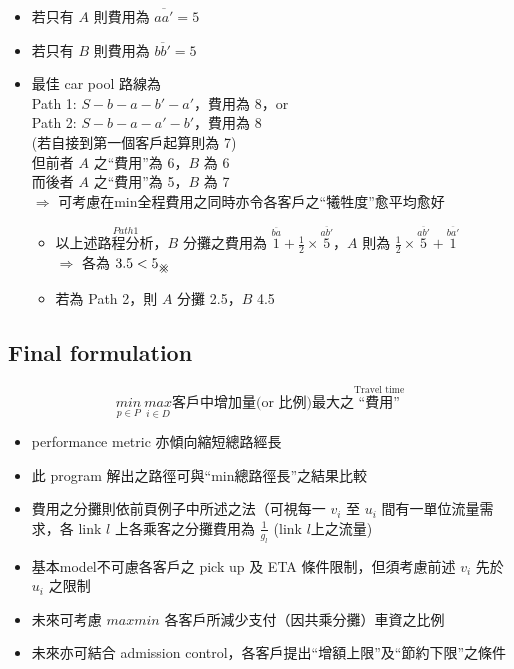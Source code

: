 \documentclass{article}
\newcommand\hash{\mathbin{\mathpalette\xhash\relax}}
\newcommand{\xhash}[2]{\ooalign{%
  $#1\xxhash{#1}{-45}$\cr
  $#1\xxhash{#1}{45}$\cr
  }%
}
\newcommand{\xxhash}[2]{\rotatebox[origin=c]{#2}{$#1\parallel$}}
\begin{document}
\begin{itemize}
  \item 若只有 $A$ 則費用為 $\overline{aa'} = 5$
  \item 若只有 $B$ 則費用為 $\overline{bb'} = 5$
  \item 最佳 car pool 路線為 \\
      Path 1: $S - b - a - b' - a'$，費用為 8，or \\
      Path 2: $S - b - a - a' - b'$，費用為 8 \\
      (若自接到第一個客戶起算則為 7) \\
      但前者 $A$ 之“費用”為 6，$B$ 為 6 \\
      而後者 $A$ 之“費用”為 5，$B$ 為 7 \\
      $\Longrightarrow$ 可考慮在min全程費用之同時亦令各客戶之“犧牲度”愈平均愈好
      \begin{itemize}
        \item 以上述$\overset{Path 1}{\text{路程分析}}$，$B$ 分攤之費用為 $\overset{\overline{ba}}{1} + \frac{1}{2} \times \overset{\overline{ab'}}{5}$，$A$ 則為 $\frac{1}{2} \times \overset{\overline{ab'}}{5} + \overset{\overline{ba'}}{1}$ \\
          $\Longrightarrow$ 各為 $3.5 < 5_{\hash}$
        \item 若為 Path 2，則 $A$ 分攤 2.5，$B$ 4.5
      \end{itemize}
\end{itemize}

\newpage
\subsection*{Final formulation}
\[
  \underset{p \in P}{min}\ \underset{i \in D}{max} \text{客戶中增加量(or 比例)最大之} \overset{\text{Travel time}}{\text{“費用”}}
\]
\begin{itemize}
  \item performance metric 亦傾向縮短總路經長
  \item 此 program 解出之路徑可與“min總路徑長”之結果比較
  \item 費用之分攤則依前頁例子中所述之法（可視每一 $v_i$ 至 $u_i$ 間有一單位流量需求，各 link $l$ 上各乘客之分攤費用為 $\frac{1}{g_l}$ (link $l$上之流量)
  \item 基本model不可慮各客戶之 pick up 及 ETA 條件限制，但須考慮前述 $v_i$ 先於 $u_i$ 之限制
  \item 未來可考慮 $max min$ 各客戶所減少支付（因共乘分攤）車資之比例
  \item 未來亦可結合 admission control，各客戶提出“增額上限”及“節約下限”之條件
\end{itemize}
\end{document}
